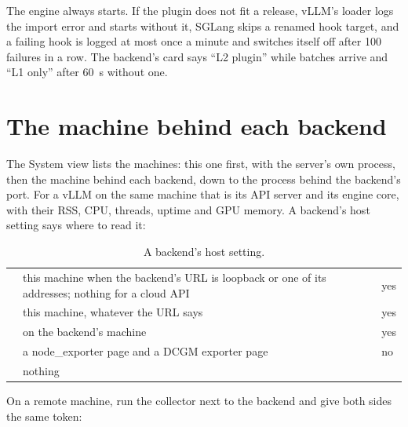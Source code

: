 The engine always starts. If the plugin does not fit a release, vLLM's loader logs the import error and starts without it, SGLang skips a renamed hook target, and a failing hook is logged at most once a minute and switches itself off after 100 failures in a row. The backend's card says \enquote{L2 plugin} while batches arrive and \enquote{L1 only} after 60~s without one.

\section{The machine behind each backend}\label{sec:hostcollect}

The System view lists the machines: this one first, with the server's own process, then the machine behind each backend, down to the process behind the backend's port. For a vLLM on the same machine that is its API server and its engine core, with their RSS, CPU, threads, uptime and GPU memory. A backend's host setting says where to read it:

\begin{table}[htbp]
\centering\small
\caption{A backend's host setting.}\label{tab:host-setting}
\begin{tabularx}{\linewidth}{@{}L{.14\linewidth}YL{.18\linewidth}@{}}
\toprule
{} &  &  \\
\midrule
{} & this machine when the backend's URL is loopback or one of its addresses; nothing for a cloud API & yes \\
 & this machine, whatever the URL says & yes \\
 &  on the backend's machine & yes \\
 & a node\_exporter page and a DCGM exporter page & no \\
 & nothing & \\
\bottomrule
\end{tabularx}
\end{table}

On a remote machine, run the collector next to the backend and give both sides the same token:


